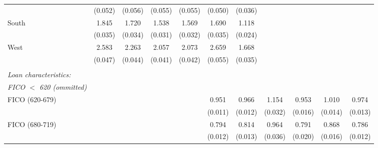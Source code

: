 {\begin{tabular}{l*{10}{c}}
                    &     (0.052)         &     (0.056)         &     (0.055)         &     (0.055)         &     (0.050)         &     (0.036)         &                     &                     &                     &                     \\
South               &       1.845\sym{***}&       1.720\sym{***}&       1.538\sym{***}&       1.569\sym{***}&       1.690\sym{***}&       1.118\sym{***}&                     &                     &                     &                     \\
                    &     (0.035)         &     (0.034)         &     (0.031)         &     (0.032)         &     (0.035)         &     (0.024)         &                     &                     &                     &                     \\
West                &       2.583\sym{***}&       2.263\sym{***}&       2.057\sym{***}&       2.073\sym{***}&       2.659\sym{***}&       1.668\sym{***}&                     &                     &                     &                     \\
                    &     (0.047)         &     (0.044)         &     (0.041)         &     (0.042)         &     (0.055)         &     (0.035)         &                     &                     &                     &                     \\
& & & & & \\ 
 \emph{Loan characteristics:} & & & & & \\ 
 \emph{FICO $<$ 620 (ommitted)} & & & & & \\ 
FICO (620-679)      &                     &                     &                     &                     &       0.951\sym{***}&       0.966\sym{**} &       1.154\sym{***}&       0.953\sym{**} &       1.010         &       0.974\sym{*}  \\
                    &                     &                     &                     &                     &     (0.011)         &     (0.012)         &     (0.032)         &     (0.016)         &     (0.014)         &     (0.013)         \\
FICO (680-719)      &                     &                     &                     &                     &       0.794\sym{***}&       0.814\sym{***}&       0.964         &       0.791\sym{***}&       0.868\sym{***}&       0.786\sym{***}\\
                    &                     &                     &                     &                     &     (0.012)         &     (0.013)         &     (0.036)         &     (0.020)         &     (0.016)         &     (0.012)         \\

\end{tabular}}
